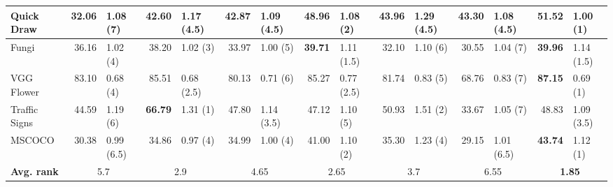 \documentclass{article} \usepackage{iclr2020_conference,times}
\begin{document}
\begin{sidewaystable*}
{\begin{tabular}{|l *{7}{r@{}l|}}
Quick Draw                  & 32.06       & 1.08 (7)         & 42.60       & 1.17 (4.5)         & 42.87       & 1.09 (4.5)            & 48.96       & 1.08 (2)           & 43.96       & 1.29 (4.5)        & 43.30       & 1.08 (4.5)             & \bf{51.52}  & 1.00 (1)        \\\hline
Fungi                       & 36.16       & 1.02 (4)         & 38.20       & 1.02 (3)           & 33.97       & 1.00 (5)              & \bf{39.71}  & 1.11 (1.5)         & 32.10       & 1.10 (6)          & 30.55       & 1.04 (7)               & \bf{39.96}  & 1.14 (1.5)      \\\hline
VGG Flower                  & 83.10       & 0.68 (4)         & 85.51       & 0.68 (2.5)         & 80.13       & 0.71 (6)              & 85.27       & 0.77 (2.5)         & 81.74       & 0.83 (5)          & 68.76       & 0.83 (7)               & \bf{87.15}  & 0.69 (1)        \\\hline
Traffic Signs               & 44.59       & 1.19 (6)         & \bf{66.79}  & 1.31 (1)           & 47.80       & 1.14 (3.5)            & 47.12       & 1.10 (5)           & 50.93       & 1.51 (2)          & 33.67       & 1.05 (7)               & 48.83       & 1.09 (3.5)      \\\hline
MSCOCO                      & 30.38       & 0.99 (6.5)       & 34.86       & 0.97 (4)           & 34.99       & 1.00 (4)              & 41.00       & 1.10 (2)           & 35.30       & 1.23 (4)          & 29.15       & 1.01 (6.5)             & \bf{43.74}  & 1.12 (1)        \\\hline\hline
\textbf{Avg. rank}          & \multicolumn{2}{c|}{5.7}       & \multicolumn{2}{c|}{2.9}         & \multicolumn{2}{c|}{4.65}           & \multicolumn{2}{c|}{2.65}        & \multicolumn{2}{c|}{3.7}        & \multicolumn{2}{c|}{6.55}            & \multicolumn{2}{c|}{\bf{1.85}}\\\hline
\end{tabular}}


\end{sidewaystable*}
\end{document}
